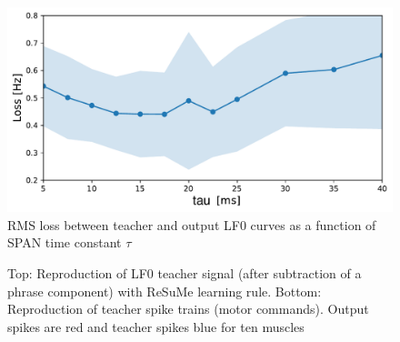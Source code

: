 \documentclass[11pt, a4paper]{article} %
\begin{document}
\begin{figure}
\centering
\includegraphics[scale=.7]{figures/SPANtheta.pdf}
\caption{RMS loss between teacher and output LF0 curves as a function of SPAN time constant $\tau$}
\label{SPANtheta}
\end{figure}

\begin{figure}
\center
{}
\caption{Top: Reproduction of LF0 teacher signal (after subtraction of a phrase component) with ReSuMe learning rule. Bottom: Reproduction of teacher spike trains (motor commands). Output spikes are red and teacher spikes blue for ten muscles}
\label{singleSampleR}
\end{figure}
\end{document}
